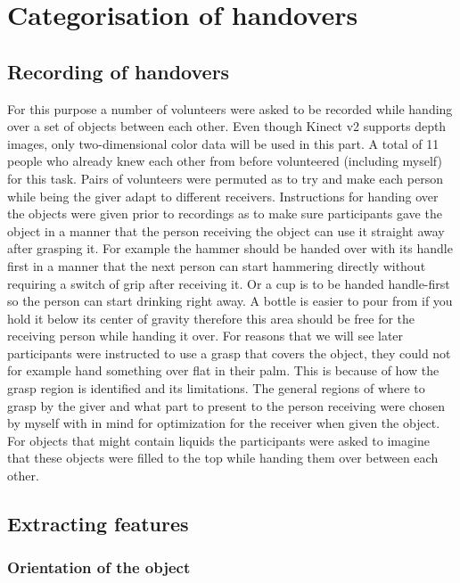 \section{Categorisation of handovers}

\subsection{Recording of handovers}

For this purpose a number of volunteers were asked to be recorded while handing over a set of objects between each other. Even though Kinect v2 supports depth images, only two-dimensional color data will be used in this part. A total of 11 people who already knew each other from before volunteered (including myself) for this task. Pairs of volunteers were permuted as to try and make each person while being the giver adapt to different receivers. Instructions for handing over the objects were given prior to recordings as to make sure participants gave the object in a manner that the person receiving the object can use it straight away after grasping it. For example the hammer should be handed over with its handle first in a manner that the next person can start hammering directly without requiring a switch of grip after receiving it. Or a cup is to be handed handle-first so the person can start drinking right away. A bottle is easier to pour from if you hold it below its center of gravity therefore this area should be free for the receiving person while handing it over. For reasons that we will see later participants were instructed to use a grasp that covers the object, they could not for example hand something over flat in their palm. This is because of how the grasp region is identified and its limitations. The general regions of where to grasp by the giver and what part to present to the person receiving were chosen by myself with in mind for optimization for the receiver when given the object. For objects that might contain liquids the participants were asked to imagine that these objects were filled to the top while handing them over between each other.

\subsection{Extracting features}


\subsubsection{Orientation of the object}

